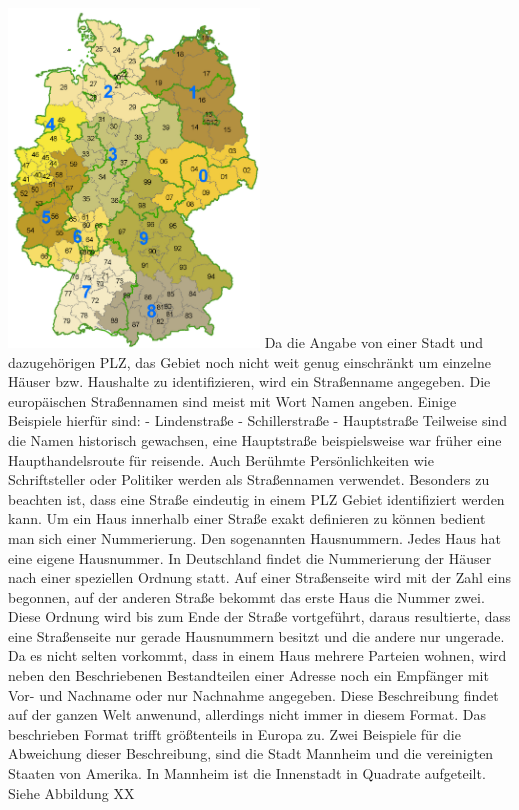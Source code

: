 \includegraphics[width=0.50\textwidth]{ref/images/plzgebiete.png}
Da die Angabe von einer Stadt und dazugehörigen PLZ, das Gebiet noch nicht weit genug einschränkt um einzelne Häuser bzw. Haushalte zu identifizieren, wird ein Straßenname angegeben.
Die europäischen Straßennamen sind meist mit Wort Namen angeben.
Einige Beispiele hierfür sind:
-	Lindenstraße
-	Schillerstraße
-	Hauptstraße
Teilweise sind die Namen historisch gewachsen, eine Hauptstraße beispielsweise war früher eine Haupthandelsroute für reisende. Auch Berühmte Persönlichkeiten wie Schriftsteller oder Politiker werden als Straßennamen verwendet. Besonders zu beachten ist, dass eine Straße eindeutig in einem PLZ Gebiet identifiziert werden kann.
Um ein Haus innerhalb einer Straße exakt definieren zu können bedient man sich einer Nummerierung. Den sogenannten Hausnummern. Jedes Haus hat eine eigene Hausnummer. 
In Deutschland findet die Nummerierung der Häuser nach einer speziellen Ordnung statt. Auf einer Straßenseite wird mit der Zahl eins begonnen, auf der anderen Straße bekommt das erste Haus die Nummer zwei. Diese Ordnung wird bis zum Ende der Straße vortgeführt, daraus resultierte, dass eine Straßenseite nur gerade Hausnummern besitzt und die andere nur ungerade.
Da es nicht selten vorkommt, dass in einem Haus mehrere Parteien wohnen, wird neben den Beschriebenen Bestandteilen einer Adresse noch ein Empfänger mit Vor- und Nachname oder nur Nachnahme angegeben.
Diese Beschreibung findet auf der ganzen Welt anwenund, allerdings nicht immer in diesem Format. Das beschrieben Format trifft größtenteils in Europa zu. Zwei Beispiele für die Abweichung dieser Beschreibung, sind die Stadt Mannheim und die vereinigten Staaten von Amerika.
In Mannheim ist die Innenstadt in Quadrate aufgeteilt. Siehe Abbildung XX 

